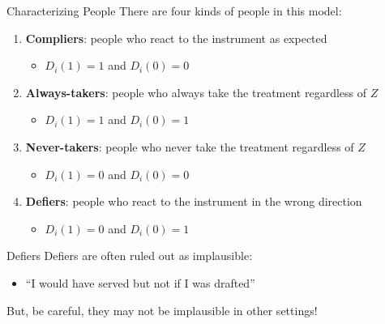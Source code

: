 \documentclass[aspectratio=169,t,11pt,table]{beamer}
\begin{document}
\begin{frame}{Characterizing People}
  There are four kinds of people in this model:
  \begin{enumerate}
    \item \textbf{Compliers}: people who react to the instrument as expected
    \begin{itemize}
      \item $D_{i}(1) = 1$ and $D_{i}(0) = 0$
    \end{itemize} 

    \item \textbf{Always-takers}: people who always take the treatment regardless of $Z$
    \begin{itemize}
      \item $D_{i}(1) = 1$ and $D_{i}(0) = 1$
    \end{itemize}

    \item \textbf{Never-takers}: people who never take the treatment regardless of $Z$
    \begin{itemize}
      \item $D_{i}(1) = 0$ and $D_{i}(0) = 0$
    \end{itemize}

    \item \textbf{Defiers}: people who react to the instrument in the wrong direction
    \begin{itemize}
      \item $D_{i}(1) = 0$ and $D_{i}(0) = 1$
    \end{itemize}
  \end{enumerate}
\end{frame}

\begin{frame}{Defiers}
  Defiers are often ruled out as implausible:
  \begin{itemize}
    \item ``I would have served but not if I was drafted''
  \end{itemize}

  \bigskip
  But, be careful, they may not be implausible in other settings!
\end{frame}
\end{document}

